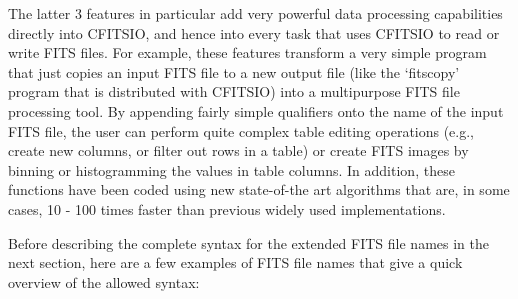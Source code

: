 \documentclass[11pt]{book}
\begin{document}
The latter 3 features in particular add very powerful data processing
capabilities directly into CFITSIO, and hence into every task that uses
CFITSIO to read or write FITS files.  For example, these features
transform a very simple program that just copies an input FITS file to
a new output file (like the `fitscopy' program that is distributed with
CFITSIO) into a multipurpose FITS file processing tool.  By appending
fairly simple qualifiers onto the name of the input FITS file, the user
can perform quite complex table editing operations (e.g., create new
columns, or filter out rows in a table) or create FITS images by
binning or histogramming the values in table columns.  In addition,
these functions have been coded using new state-of-the art algorithms
that are, in some cases, 10 - 100 times faster than previous widely
used implementations.

Before describing the complete syntax for the extended FITS file names
in the next section, here are a few examples of FITS file names that
give a quick overview of the allowed syntax:
\end{document}

